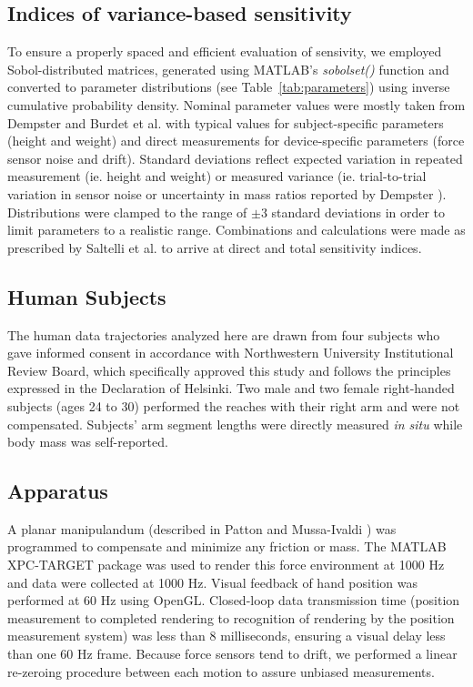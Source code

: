 \subsection*{Indices of variance-based sensitivity}
To ensure a properly spaced and efficient evaluation of sensivity, we employed Sobol-distributed matrices, generated using MATLAB's \textit{sobolset()} function and converted to parameter distributions (see Table~\ref{tab:parameters}) using inverse cumulative probability density. Nominal parameter values were mostly taken from Dempster \cite{dempster1955space} and Burdet et al. \cite{burdet2006stability} with typical values for subject-specific parameters (height and weight) and direct measurements for device-specific parameters (force sensor noise and drift). Standard deviations reflect expected variation in repeated measurement (ie. height and weight) or measured variance (ie. trial-to-trial variation in sensor noise or uncertainty in mass ratios reported by Dempster \cite{dempster1955space}). Distributions were clamped to the range of $\pm3$ standard deviations in order to limit parameters to a realistic range. Combinations and calculations were made as prescribed by Saltelli et al. \cite{saltelli2010variance} to arrive at direct and total sensitivity indices.

\subsection*{Human Subjects}
The human data trajectories analyzed here are drawn from four subjects who gave informed consent in accordance with Northwestern University Institutional Review Board, which specifically approved this study and follows the principles expressed in the Declaration of Helsinki. Two male and two female right-handed subjects (ages 24 to 30) performed the reaches with their right arm and were not compensated. Subjects' arm segment lengths were directly measured \textit{in situ} while body mass was self-reported. 

\subsection*{Apparatus}
A planar manipulandum (described in Patton and Mussa-Ivaldi \cite{patton2004robot}) was programmed to compensate and minimize any friction or mass. The MATLAB XPC-TARGET package \cite{MATLAB:2008} was used to render this force environment at 1000 Hz and data were collected at 1000 Hz.  Visual feedback of hand position was performed at 60 Hz using OpenGL. Closed-loop data transmission time (position measurement to completed rendering to recognition of rendering by the position measurement system) was less than 8 milliseconds, ensuring a visual delay less than one 60 Hz frame. Because force sensors tend to drift, we performed a linear re-zeroing procedure between each motion to assure unbiased measurements. 

